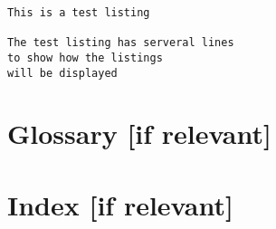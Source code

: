 \documentclass[oneside]{../ecsthesis}    %
\begin{document}


\begin{lstlisting}[caption=Listing of what an example listing would be like]
This is a test listing

The test listing has serveral lines
to show how the listings
will be displayed
\end{lstlisting}
\appendix

\clearpage
\backmatter
\chapter{Glossary [if relevant]}
\printbibliography[heading=bibintoc]
\chapter{Index [if relevant]}
\end{document}
